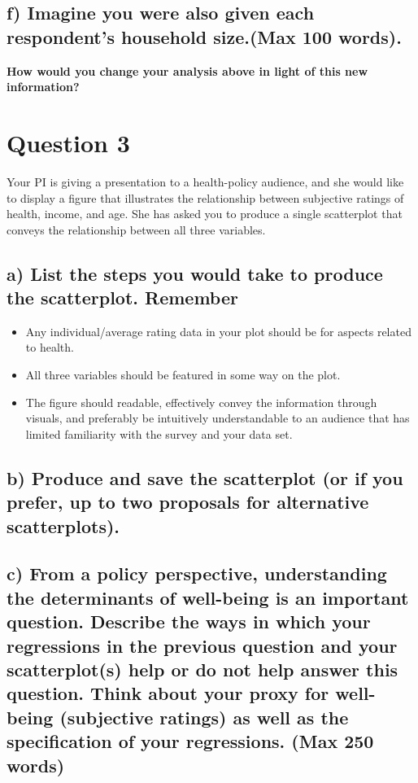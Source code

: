 \documentclass[12pt,a4paper]{article}
\begin{document}
	\subsection*{\normalsize{f) Imagine you were also given each respondent’s household size.(Max 100 words).}}
	
	
	
	 \textbf{How would you change your analysis above in light of this new information?}	
	 
	 
	 
\section*{{\textcolor[rgb]{0.0667, 0.1255, 0.1922}{Question 3}}}

Your PI is giving a presentation to a health-policy audience, and she would like to display a figure that illustrates the relationship between subjective ratings of health, income, and age. She has asked you to produce a single scatterplot that conveys the relationship between all three variables.

	\subsection*{\normalsize{a) List the steps you would take to produce the scatterplot. Remember}}
	\begin{itemize}
		\item Any individual/average rating data in your plot should be for aspects related to health.
		\item All three variables should be featured in some way on the plot.
		\item The figure should readable, effectively convey the information through visuals, and preferably
		be intuitively understandable to an audience that has limited familiarity with the
		survey and your data set.
	\end{itemize}
	\subsection*{\normalsize{b) Produce and save the scatterplot (or if you prefer, up to two proposals for alternative scatterplots).}}
	\subsection*{\normalsize{c) From a policy perspective, understanding the determinants of well-being is an important question. Describe the ways in which your regressions in the previous question and your scatterplot(s) help or do not help answer this question. Think about your proxy for well-being (subjective ratings) as well as the specification of your regressions. (Max 250 words)}}
\end{document}
